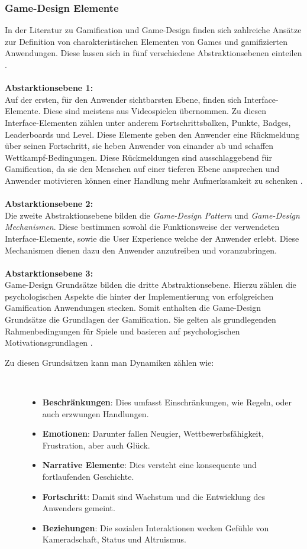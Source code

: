 \documentclass[a4paper,12pt]{scrartcl}
\begin{document}
\subsubsection{Game-Design Elemente}
In der Literatur zu Gamification und Game-Design finden sich zahlreiche Ansätze zur Definition von charakteristischen Elementen von Games und gamifizierten Anwendungen. Diese lassen sich in fünf verschiedene Abstraktionsebenen einteilen \cite{Deterding2011}.
\\\\
\textbf{Abstarktionsebene 1:}\\
Auf der ersten, für den Anwender sichtbarsten Ebene, finden sich Interface-Elemente. Diese sind meistens aus Videospielen übernommen. Zu diesen Interface-Elementen zählen unter anderem Fortschrittsbalken, Punkte, Badges, Leaderboards und Level. Diese Elemente geben den Anwender eine Rückmeldung über seinen Fortschritt, sie heben Anwender von einander ab und schaffen Wettkampf-Bedingungen. Diese Rückmeldungen sind ausschlaggebend für Gamification, da sie den Menschen auf einer tieferen Ebene ansprechen und Anwender motivieren können einer Handlung mehr Aufmerksamkeit zu schenken \cite{GameElemente2018}.
\\\\
\textbf{Abstarktionsebene 2:}\\
Die zweite Abstraktionsebene bilden die \textit{Game-Design Pattern} und \textit{Game-Design Mechanismen}. Diese bestimmen sowohl die Funktionsweise der verwendeten Interface-Elemente, sowie die User Experience welche der Anwender erlebt. Diese Mechanismen dienen dazu den Anwender anzutreiben und voranzubringen.
\\\\
\textbf{Abstarktionsebene 3:}\\
Game-Design Grundsätze bilden die dritte Abstraktionsebene. Hierzu zählen die psychologischen Aspekte die hinter der Implementierung von erfolgreichen Gamification Anwendungen stecken. Somit enthalten die Game-Design Grundsätze die Grundlagen der Gamification. Sie gelten als grundlegenden Rahmenbedingungen für Spiele und basieren auf psychologischen Motivationsgrundlagen \cite{Werbach2012}. 
\begin{description}
   \item[Zu diesen Grundsätzen kann man Dynamiken zählen wie:]~\par
   \begin{itemize}
      \item \textbf{Beschränkungen}: Dies umfasst Einschränkungen, wie Regeln, oder auch erzwungen Handlungen.
      \item \textbf{Emotionen}: Darunter fallen Neugier, Wettbewerbsfähigkeit, Frustration, aber auch Glück.
      \item \textbf{Narrative Elemente}: Dies versteht eine konsequente und fortlaufenden Geschichte.
      \item \textbf{Fortschritt}: Damit sind Wachstum und die Entwicklung des Anwenders gemeint.
      \item \textbf{Beziehungen}: Die sozialen Interaktionen wecken Gefühle von Kameradschaft, Status und Altruismus.
   \end{itemize}
\end{description}
\end{document}
